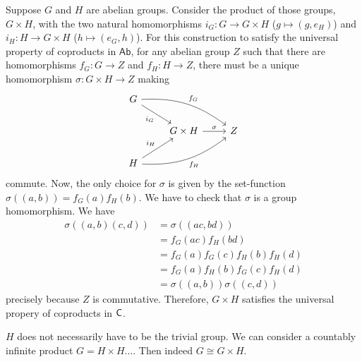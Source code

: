 \begin{solution}
		Suppose $G$ and $H$ are abelian groups. Consider the product of those groups, $G \times H$, with the two natural homomorphisms $i_G: G \to G \times H$ ($g \mapsto (g, e_H)$) and $i_H: H \to G \times H$ ($h \mapsto (e_G, h)$). For this construction to satisfy the universal property of coproducts in $\mathsf{Ab}$, for any abelian group $Z$ such that there are homomorphisms $f_G: G \to Z$ and $f_H: H \to Z$, there must be a unique homomorphism $\sigma: G \times H \to Z$ making
		\begin{equation*}
			\begin{tikzcd}
				G
					\arrow[drr, bend left=20, "f_G"]
					\arrow[dr, "i_G" swap]
					& &\\
				&
					G \times H
						\arrow[r, "\sigma"]
					& Z\\
				H
					\arrow[urr, bend right=20, "f_H"']
					\arrow[ur, "i_H"]
					& &
			\end{tikzcd}
		\end{equation*}
		commute. Now, the only choice for $\sigma$ is given by the set-function $\sigma((a,b))=f_G(a)f_H(b)$. We have to check that $\sigma$ is a group homomorphism.
		We have
		\begin{equation*}
			\begin{aligned}
				\sigma((a,b)(c,d)) &= \sigma((ac,bd))\\
				&= f_G(ac)f_H(bd)\\
				&= f_G(a)f_G(c)f_H(b)f_H(d)\\
				&= f_G(a)f_H(b)f_G(c)f_H(d)\\
				&=\sigma((a,b))\sigma((c,d))
			\end{aligned}
		\end{equation*} 
		precisely because $Z$ is commutative. Therefore, $G \times H$ satisfies the universal propery of coproducts in $\mathsf{C}$.
\end{solution}

\begin{problem}
\end{problem}

\begin{solution}
	$H$ does not necessarily have to be the trivial group. We can consider a countably infinite product $G = H \times H \dots$. Then indeed $G \cong G \times H$.
\end{solution}

\begin{problem}
\end{problem}

